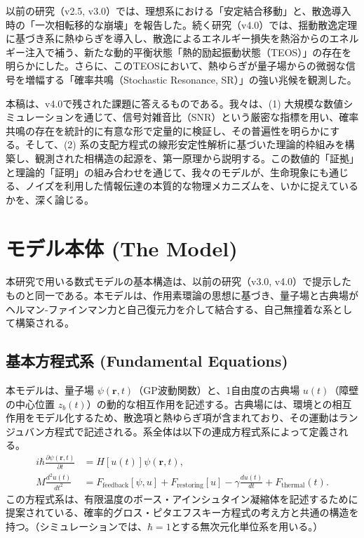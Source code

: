 \documentclass[a4paper,11pt,ja=standard,lualatex]{bxjsarticle}
\begin{document}
以前の研究（v2.5, v3.0）では、理想系における「安定結合移動」と、散逸導入時の「一次相転移的な崩壊」を報告した。続く研究（v4.0）では、揺動散逸定理に基づき系に熱ゆらぎを導入し、散逸によるエネルギー損失を熱浴からのエネルギー注入で補う、新たな動的平衡状態「熱的励起振動状態（TEOS）」の存在を明らかにした。さらに、このTEOSにおいて、熱ゆらぎが量子場からの微弱な信号を増幅する「確率共鳴（Stochastic Resonance, SR）」\cite{benzi, mcnamara, gammaitoni}の強い兆候を観測した。

本稿は、v4.0で残された課題に答えるものである。我々は、(1) 大規模な数値シミュレーションを通じて、信号対雑音比（SNR）という厳密な指標を用い、確率共鳴の存在を統計的に有意な形で定量的に検証し、その普遍性を明らかにする。そして、(2) 系の支配方程式の線形安定性解析に基づいた理論的枠組みを構築し、観測された相構造の起源を、第一原理から説明する。この数値的「証拠」と理論的「証明」の組み合わせを通じて、我々のモデルが、生命現象にも通じる、ノイズを利用した情報伝達の本質的な物理メカニズムを、いかに捉えているかを、深く論じる。

\FloatBarrier
\section{モデル本体 (The Model)}
本研究で用いる数式モデルの基本構造は、以前の研究（v3.0, v4.0）で提示したものと同一である。本モデルは、作用素環論の思想に基づき、量子場と古典場がヘルマン-ファインマン力と自己復元力を介して結合する、自己無撞着な系として構築される。

\subsection{基本方程式系 (Fundamental Equations)}
本モデルは、量子場 $\psi(\mathbf{r},t)$（GP波動関数）と、1自由度の古典場 $u(t)$（障壁の中心位置 $z_b(t)$）の動的な相互作用を記述する。古典場には、環境との相互作用をモデル化するため、散逸項と熱ゆらぎ項が含まれており、その運動はランジュバン方程式で記述される。系全体は以下の連成方程式系によって定義される。
\begin{align}
 i\hbar\frac{\partial\psi(\mathbf r,t)}{\partial t}&=H[u(t)]\psi(\mathbf r,t), \label{eq:schrodinger_v5} \\
  M\frac{d^{2}u(t)}{dt^{2}}&=F_{\text{feedback}}[\psi,u]+F_{\text{restoring}}[u] - \gamma \frac{du(t)}{dt} + F_{\text{thermal}}(t). \label{eq:langevin_v5}
\end{align}
この方程式系は、有限温度のボース・アインシュタイン凝縮体を記述するために提案されている、確率的グロス・ピタエフスキー方程式\cite{bradley}の考え方と共通の構造を持つ。（シミュレーションでは、$\hbar=1$とする無次元化単位系を用いる。）
\end{document}
